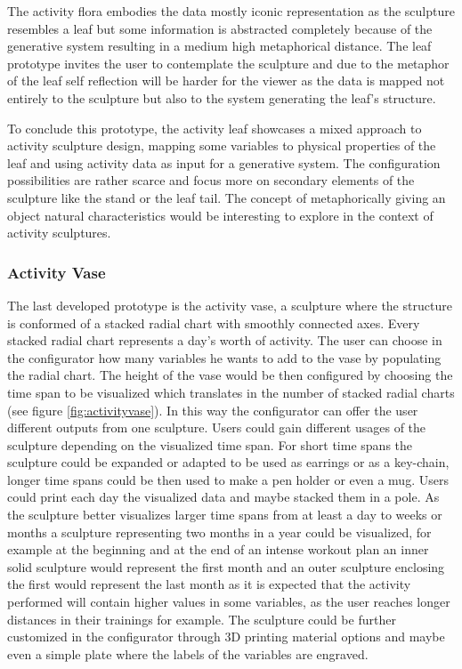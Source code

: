 \documentclass[../medieninformatik-arbeit.tex]{subfiles}
\begin{document}
The activity flora embodies the data mostly iconic representation as the sculpture resembles a leaf but some information is abstracted completely because of the generative system resulting in a medium high metaphorical distance. The leaf prototype invites the user to contemplate the sculpture and due to the metaphor of the leaf self reflection will be harder for the viewer as the data is mapped not entirely to the sculpture but also to the system generating the leaf's structure.

To conclude this prototype, the activity leaf showcases a mixed approach to activity sculpture design, mapping some variables to physical properties of the leaf and using activity data as input for a generative system. The configuration possibilities are rather scarce and focus more on secondary elements of the sculpture like the stand or the leaf tail. The concept of metaphorically giving an object natural characteristics would be interesting to explore in the context of activity sculptures.

\subsubsection{Activity Vase}
\label{sub:activtyvase}
The last developed prototype is the activity vase, a sculpture where the structure is conformed of a stacked radial chart with smoothly connected axes. Every stacked radial chart represents a day's worth of activity. The user can choose in the configurator how many variables he wants to add to the vase by populating the radial chart. The height of the vase would be then configured by choosing the time span to be visualized which translates in the number of stacked radial charts (see figure \ref{fig:activityvase}). In this way the configurator can offer the user different outputs from one sculpture. Users could gain different usages of the sculpture depending on the visualized time span. For short time spans the sculpture could be expanded or adapted to be used as earrings or as a key-chain, longer time spans could be then used to make a pen holder or even a mug. Users could print each day the visualized data and maybe stacked them in a pole. As the sculpture better visualizes larger time spans from at least a day to weeks or months a sculpture representing two months in a year could be visualized, for example at the beginning and at the end of an intense workout plan an inner solid sculpture would represent the first month and an outer sculpture enclosing the first would represent the last month as it is expected that the activity performed will contain higher values in some variables, as the user reaches longer distances in their trainings for example. The sculpture could be further customized in the configurator through 3D printing material options and maybe even a simple plate where the labels of the variables are engraved. 
\end{document}
